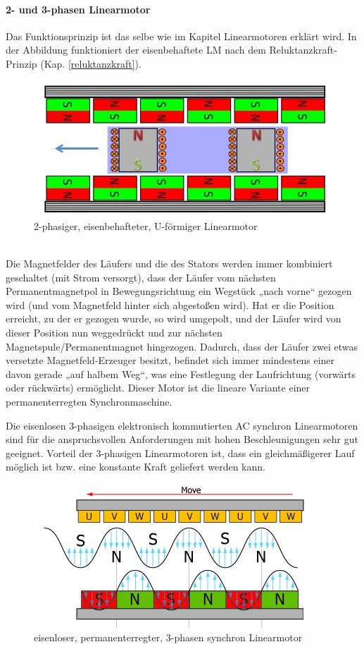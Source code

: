 				\paragraph{2- und 3-phasen Linearmotor} 
					\begin{description}[leftmargin=2.5cm]
						\item[Bsp. 2-phasen Linearmotor]
						Das Funktionsprinzip ist das selbe wie im Kapitel Linearmotoren erklärt wird. In der Abbildung funktioniert der eisenbehaftete LM nach dem Reluktanzkraft-Prinzip (Kap. \ref{reluktanzkraft}).	\\
						\begin{figure}[h]
							\centering
							\includegraphics[width=0.6\linewidth]{./pics/el/2phase}
							\caption{2-phasiger, eisenbehafteter, U-förmiger Linearmotor}
						\end{figure} \\
						Die Magnetfelder des Läufers und die des Stators werden immer kombiniert geschaltet (mit Strom versorgt), dass der Läufer vom nächsten Permanentmagnetpol in Bewegungsrichtung ein Wegstück „nach vorne“ gezogen wird (und vom Magnetfeld hinter sich abgestoßen wird). Hat er die Position erreicht, zu der er gezogen wurde, so wird umgepolt, und der Läufer wird von dieser Position nun weggedrückt und zur nächsten Magnetspule/Permanentmagnet hingezogen. Dadurch, dass der Läufer zwei etwas versetzte Magnetfeld-Erzeuger besitzt, befindet sich immer mindestens einer davon gerade „auf halbem Weg“, was eine Festlegung der Laufrichtung (vorwärts oder rückwärts) ermöglicht. Dieser Motor ist die lineare Variante einer permanenterregten Synchronmaschine.
						
						\item[Bsp. 3-phasen Linearmotor]
						Die eisenlosen 3-phasigen elektronisch kommutierten AC synchron
						Linearmotoren sind für die anspruchsvollen Anforderungen
						mit hohen Beschleunigungen sehr gut geeignet. Vorteil der 3-phasigen Linearmotoren ist, dass ein gleichmäßigerer Lauf möglich ist bzw. eine konstante Kraft geliefert werden kann.
						\begin{figure}[h]
							\centering
							\includegraphics[width=0.7\linewidth]{./pics/el/3phaseLin}
							\caption{eisenloser, permanenterregter, 3-phasen synchron Linearmotor}
						\end{figure}
					\end{description}
					
